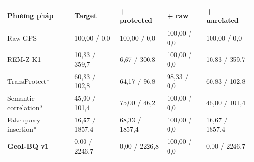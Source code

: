 \par\smallskip\noindent\begin{tabularx}{\linewidth}{@{}P{3.2cm}XXXX@{}}\toprule
\textbf{Phương pháp} & \textbf{Target} & \textbf{+ protected} & \textbf{+ raw} & \textbf{+ unrelated} \\
\midrule
Raw GPS & 100{,}00 / 0{,}0 & 100{,}00 / 0{,}0 & 100{,}00 / 0{,}0 & 100{,}00 / 0{,}0 \\
REM-Z K1 & 10{,}83 / 359{,}7 & 6{,}67 / 300{,}8 & 100{,}00 / 0{,}0 & 10{,}83 / 359{,}7 \\
TransProtect* & 60{,}83 / 102{,}8 & 64{,}17 / 96{,}8 & 98{,}33 / 0{,}0 & 60{,}83 / 102{,}8 \\
Semantic correlation* & 45{,}00 / 101{,}4 & 75{,}00 / 46{,}2 & 100{,}00 / 0{,}0 & 45{,}00 / 101{,}4 \\
Fake-query insertion* & 16{,}67 / 1857{,}4 & 68{,}33 / 1857{,}4 & 100{,}00 / 0{,}0 & 16{,}67 / 1857{,}4 \\
\textbf{GeoI-BQ v1} & 0{,}00 / 2246{,}7 & 0{,}00 / 2226{,}8 & 100{,}00 / 0{,}0 & 0{,}00 / 2246{,}7 \\
\bottomrule\end{tabularx}\par\smallskip
